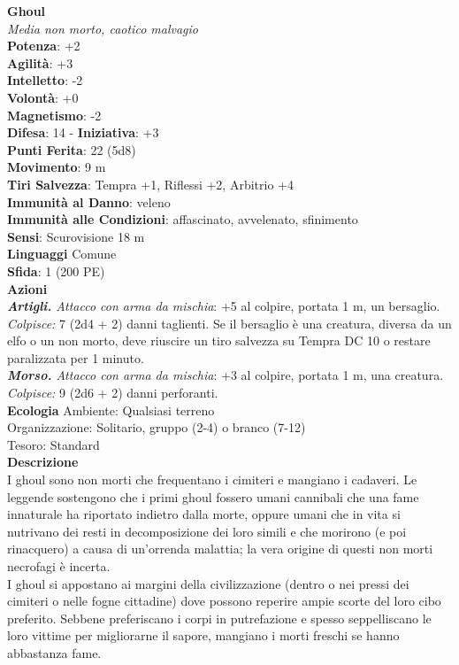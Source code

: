 \begin{multicols}{2}
\medskip\textbf{Ghoul}\\
\emph{Media non morto, caotico malvagio}\\
\textbf{Potenza}: +2\\
\textbf{Agilità}: +3\\
\textbf{Intelletto}: -2\\
\textbf{Volontà}: +0\\
\textbf{Magnetismo}: -2\\
\textbf{Difesa}: 14 - \textbf{Iniziativa}: +3\\
\textbf{Punti Ferita}: 22 (5d8)\\
\textbf{Movimento}: 9 m\\
\textbf{Tiri Salvezza}: Tempra +1, Riflessi +2, Arbitrio +4\\
\textbf{Immunità al Danno}: veleno\\
\textbf{Immunità alle Condizioni}: affascinato, avvelenato, sfinimento\\
\textbf{Sensi}: Scurovisione 18 m\\
\textbf{Linguaggi} Comune\\
\textbf{Sfida}: 1 (200 PE)\smallskip\\
\smallskip\textbf{Azioni}\\
\emph{\textbf{Artigli.} Attacco con arma da mischia}: +5 al colpire, portata 1 m, un bersaglio.\\
\emph{Colpisce:} 7 (2d4 + 2) danni taglienti. Se il bersaglio è una creatura, diversa da un elfo o un non morto, deve riuscire un tiro salvezza su Tempra DC 10 o restare paralizzata per 1 minuto.\\
\emph{\textbf{Morso.} Attacco con arma da mischia}: +3 al colpire, portata 1 m, una creatura.\\
\emph{Colpisce:} 9 (2d6 + 2) danni perforanti.\\
\textbf{Ecologia}
Ambiente: Qualsiasi terreno\\
Organizzazione: Solitario, gruppo (2-4) o branco (7-12)\\
Tesoro: Standard\\
\textbf{Descrizione}\\
I ghoul sono non morti che frequentano i cimiteri e mangiano i cadaveri. Le leggende sostengono che i primi ghoul fossero umani cannibali che una fame innaturale ha riportato indietro dalla morte, oppure umani che in vita si nutrivano dei resti in decomposizione dei loro simili e che morirono (e poi rinacquero) a causa di un’orrenda malattia; la vera origine di questi non morti necrofagi è incerta.\\
I ghoul si appostano ai margini della civilizzazione (dentro o nei pressi dei cimiteri o nelle fogne cittadine) dove possono reperire ampie scorte del loro cibo preferito. Sebbene preferiscano i corpi in putrefazione e spesso seppelliscano le loro vittime per migliorarne il sapore, mangiano i morti freschi se hanno abbastanza fame.\\


\end{multicols}
